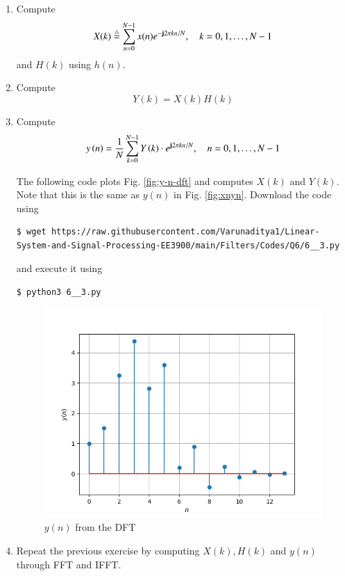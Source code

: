 \documentclass[journal,12pt,twocolumn]{IEEEtran}
\renewcommand\thesection{\arabic{section}}
\begin{document}
\begin{enumerate}[label=\thesection.\arabic*]
\item
Compute
\begin{equation}
X(k) \stackrel{\triangle}{=} \sum _{n=0}^{N-1}x(n) e^{-\mathbf{j}2\pi kn/N}, \quad k = 0,1,\dots, N-1
\end{equation}
and $H(k)$ using $h(n)$.
\item Compute 
\begin{equation}
Y(k) = X(k)H(k)
\label{eq:fp}
\end{equation}
\item Compute
\begin{equation}
y\left(n\right)={\frac {1}{N}}\sum _{k=0}^{N-1}Y\left(k\right)\cdot e^{\mathbf{j} 2\pi kn/N},\quad n = 0,1,\dots, N-1
\label{eq:inv-ft}
\end{equation}

\solution The following code plots Fig. \eqref{fig:y-n-dft} and computes $X(k)$
and $Y(k)$. Note that this is the same as $y(n)$ in Fig. \eqref{fig:xnyn}.
Download the code using
\begin{lstlisting}
$ wget https://raw.githubusercontent.com/Varunaditya1/Linear-System-and-Signal-Processing-EE3900/main/Filters/Codes/Q6/6__3.py
\end{lstlisting}
and execute it using
\begin{lstlisting}
$ python3 6__3.py
\end{lstlisting}

\begin{figure}[!ht]
	\centering
	\includegraphics[width=\columnwidth]{Figures/Q6/6__3.png}
	\caption{$y(n)$ from the DFT}
	\label{fig:y-n-dft}
\end{figure}
\item Repeat the previous exercise by computing $X(k), H(k)$ and $y(n)$ through FFT and 
IFFT.


\end{enumerate}
\end{document}
